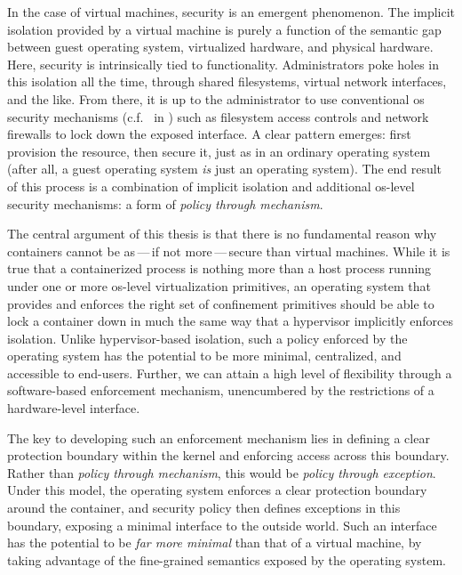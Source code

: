 
In the case of virtual machines, security is an emergent phenomenon. The implicit
isolation provided by a virtual machine is purely a function of the semantic gap between
guest operating system, virtualized hardware, and physical hardware. Here, security is
intrinsically tied to functionality. Administrators poke holes in this isolation all the
time, through shared filesystems, virtual network interfaces, and the like. From there, it
is up to the administrator to use conventional \gls{os} security mechanisms
(c.f.~ in ) such
as filesystem access controls and network firewalls to lock down the exposed interface.
A clear pattern emerges: first provision the resource, then secure it, just as in an
ordinary operating system (after all, a guest operating system \textit{is} just an
operating system). The end result of this process is a combination of implicit isolation
and additional \gls{os}-level security mechanisms: a form of \textit{policy through
mechanism}.

The central argument of this thesis is that there is no fundamental reason why containers
cannot be as\,---\,if not more\,---\,secure than virtual machines.  While it is true that
a containerized process is nothing more than a host process running under one or more
\gls{os}-level virtualization primitives, an operating system that provides and enforces
the right set of confinement primitives should be able to lock a container down in much
the same way that a hypervisor implicitly enforces isolation.  Unlike hypervisor-based
isolation, such a policy enforced by the operating system has the potential to be more
minimal, centralized, and accessible to end-users. Further, we can attain a high level of
flexibility through a software-based enforcement mechanism, unencumbered by the
restrictions of a hardware-level interface.

The key to developing such an enforcement mechanism lies in defining a clear protection
boundary within the kernel and enforcing access across this boundary. Rather than
\textit{policy through mechanism}, this would be \textit{policy through exception}. Under
this model, the operating system enforces a clear protection boundary around the
container, and security policy then defines exceptions in this boundary, exposing
a minimal interface to the outside world.  Such an interface has the potential to be
\textit{far more minimal}  than that of a virtual machine, by taking advantage of the
fine-grained semantics exposed by the operating system.

